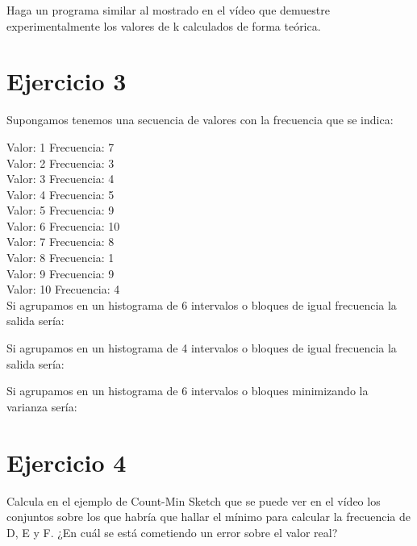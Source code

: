 \documentclass{uimppracticas}
\begin{document}
Haga un programa similar al mostrado en el vídeo que demuestre experimentalmente los valores de k calculados de forma teórica.


\section{Ejercicio 3}

Supongamos tenemos una secuencia de valores con la frecuencia que se indica:

Valor: 1 Frecuencia: 7\\
Valor: 2 Frecuencia: 3\\
Valor: 3 Frecuencia: 4\\
Valor: 4 Frecuencia: 5\\
Valor: 5 Frecuencia: 9\\
Valor: 6 Frecuencia: 10\\
Valor: 7 Frecuencia: 8\\
Valor: 8 Frecuencia: 1\\
Valor: 9 Frecuencia: 9\\
Valor: 10 Frecuencia: 4\\

Si agrupamos en un histograma de 6 intervalos o bloques de igual frecuencia la salida sería:

Si agrupamos en un histograma de 4 intervalos o bloques de igual frecuencia la salida sería:

Si agrupamos en un histograma de 6 intervalos o bloques minimizando la varianza sería:

\section{Ejercicio 4}

Calcula en el ejemplo de Count-Min Sketch que se puede ver en el vídeo los conjuntos sobre los que habría que hallar el mínimo para calcular la frecuencia de D, E y F. ¿En cuál se está cometiendo un error sobre el valor real?
\end{document}
